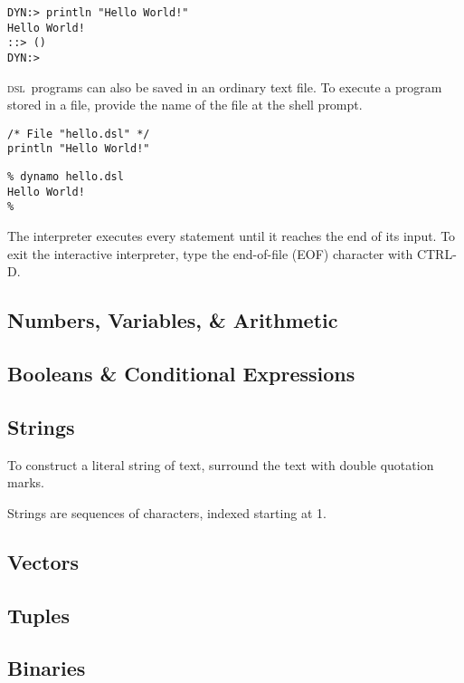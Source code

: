 \documentclass[11pt]{article}
\newcommand{\DSL}{{\scshape dsl}}
\begin{document}
\begin{lstlisting}
DYN:> println "Hello World!"
Hello World!
::> ()
DYN:> 
\end{lstlisting}

\DSL\ programs can also be saved in an ordinary text file.
To execute a program stored in a file, provide the name of the file at the shell prompt.

\begin{lstlisting}
/* File "hello.dsl" */
println "Hello World!"
\end{lstlisting}

\begin{verbatim}
% dynamo hello.dsl
Hello World!
% 
\end{verbatim}

The interpreter executes every statement until it reaches the end of its input.
To exit the interactive interpreter, type the end-of-file (EOF) character with CTRL-D.

\subsection{Numbers, Variables, \& Arithmetic}

\subsection{Booleans \& Conditional Expressions}

\subsection{Strings}

To construct a literal string of text, surround the text with double quotation marks.

Strings are sequences of characters, indexed starting at 1.

\subsection{Vectors}

\subsection{Tuples}

\subsection{Binaries}
\end{document}
